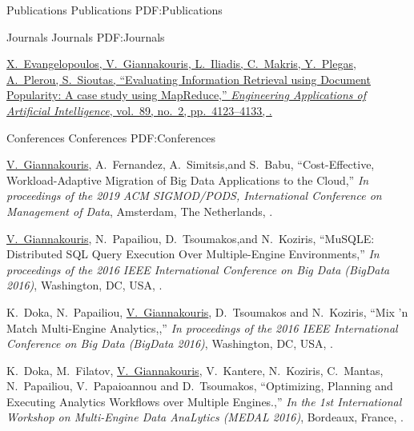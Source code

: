 
\Section
{Publications}
{Publications}
{PDF:Publications}

\SubSection
{Journals}
{Journals}
{PDF:Journals}

\begingroup
\renewcommand{\MaxNumberedItem}{[88]}

\BigGap
\NumberedItem{[1]}
\href{http://www.example.com/my-paper-doi-5}
{X.~Evangelopoulos, \underline{V.~Giannakouris}, L.~Iliadis, C.~Makris, Y.~Plegas, A.~Plerou, S.~Sioutas,
``Evaluating Information Retrieval using Document Popularity: A case
study using MapReduce,''
\textit{Engineering Applications of Artificial Intelligence},
vol.~89,
no.~2,
pp.~4123--4133,
.}

\endgroup

\BigGap
\SubSection
{Conferences}
{Conferences}
{PDF:Conferences}

\begingroup
\renewcommand{\MaxNumberedItem}{[8888]}

\BigGap
\Gap
\NumberedItem{[1]}
{\underline{V.~Giannakouris}, A.~Fernandez, A.~Simitsis,and S.~Babu,
	``Cost-Effective, Workload-Adaptive Migration of Big Data Applications to the Cloud,'' \textit{In proceedings of the 2019 ACM SIGMOD/PODS, International Conference on Management of Data},
	Amsterdam, The Netherlands,
	.}

\NumberedItem{[2]}
{\underline{V.~Giannakouris}, N.~Papailiou, D.~Tsoumakos,and N.~Koziris,
	``MuSQLE: Distributed SQL Query Execution Over Multiple-Engine Environments,'' \textit{In proceedings of the 2016 IEEE International Conference on Big Data (BigData 2016)},
	Washington, DC, USA,
	.}

\NumberedItem{[3]}
{K.~Doka, N.~Papailiou, \underline{V.~Giannakouris}, D.~Tsoumakos and N.~Koziris,
``Mix 'n Match Multi-Engine Analytics,,'' \textit{In proceedings of the 2016 IEEE International Conference on Big Data (BigData 2016)},
Washington, DC, USA,
.}

\NumberedItem{[4]}
{K.~Doka, M.~Filatov, \underline{V.~Giannakouris}, V.~Kantere, N.~Koziris,
	C.~Mantas, N.~Papailiou, V.~Papaioannou and D.~Tsoumakos,
	``Optimizing, Planning and Executing Analytics Workflows over Multiple Engines.,'' \textit{In the 1st International Workshop on Multi-Engine Data AnaLytics (MEDAL 2016)},
	Bordeaux, France,
.}

